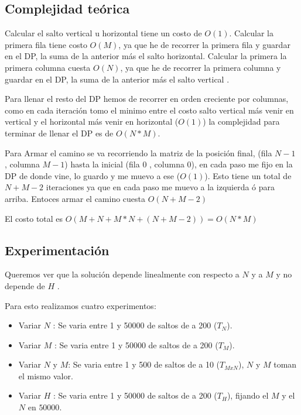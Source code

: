     \subsection{Complejidad teórica}

    Calcular el salto vertical u horizontal tiene un costo de $O(1)$. Calcular la primera fila tiene costo $O(M)$, ya que he de recorrer la primera fila y guardar en el DP, la suma de la anterior más el salto horizontal. Calcular la primera la primera columna cuesta $O(N)$, ya que he de recorrer la primera columna y guardar en el DP,  la suma de la anterior más el salto vertical .

    Para llenar el resto del DP hemos de recorrer en orden creciente por columnas, como en cada iteración tomo el minimo entre el costo salto vertical más venir en vertical y el horizontal más venir en horizontal ($O(1)$) la complejidad para terminar de llenar el DP es de $O(N*M)$.

    Para Armar el camino se va recorriendo la matriz de la posición final, (fila $N - 1$ , columna $M - 1$) hasta la inicial (fila $0$ , columna $0$), en cada paso me fijo en la DP de donde vine, lo guardo y me muevo a ese ($O(1)$). Esto tiene un total de $N + M - 2$ iteraciones ya que en cada paso me muevo a la izquierda ó para arriba. Entoces armar el camino cuesta $O(N + M - 2)$

    El costo total es $O( M + N + M*N + (N + M - 2) ) = O(N*M)$
     
    \subsection{Experimentación}
    Queremos ver que la solución depende linealmente con respecto a $N$ y a $M$ y no depende de $H$ .

    Para esto realizamos cuatro experimentos:
    \begin{itemize}
        \item Variar $N$ : Se varia entre 1 y 50000 de saltos de a 200 ($T_N$).
        \item Variar $M$ : Se varia entre 1 y 50000 de saltos de a 200 ($T_M$).
        \item Variar $N$ y $M$: Se varia entre 1 y 500 de saltos de a 10 ($T_{MxN}$), $N$ y $M$ toman el mismo valor.
        \item Variar $H$ : Se varia entre 1 y 50000 de saltos de a 200 ($T_H$), fijando el $M$ y el $N$ en $50000$.
    \end{itemize}

